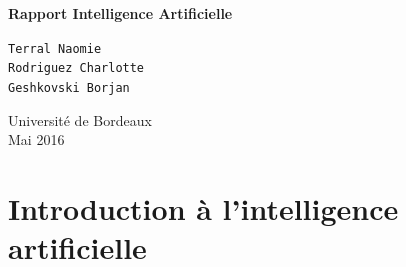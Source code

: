 \documentclass[12pt]{article}
\begin{document}
\begin{titlepage}
\begin{center}
   \vspace*{1cm}
    \textbf{Rapport Intelligence Artificielle}
    \vspace{0.5cm}
   
    \vspace{1.5cm}
   
    \texttt{Terral Naomie}\\
    \texttt{Rodriguez Charlotte}\\
    \texttt{Geshkovski Borjan}
    \vfill
    
    \vspace{0.8cm}
    
   Université de Bordeaux\\
   Mai 2016
\end{center}
\end{titlepage}
\title{}
\tableofcontents
\clearpage

\section{Introduction à l'intelligence artificielle}
\end{document}
